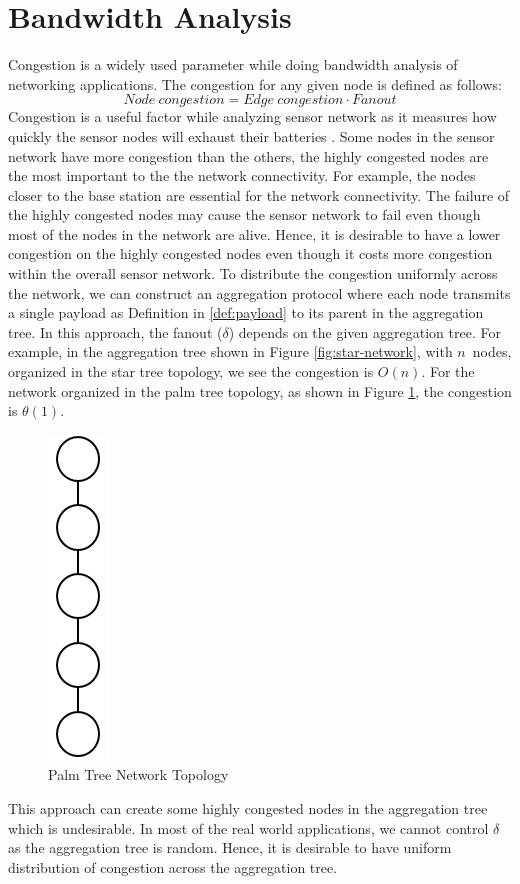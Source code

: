 \section{Bandwidth Analysis}
	Congestion is a widely used parameter while doing bandwidth analysis of networking applications.
	The congestion for any given node is defined as follows:
	\begin{equation}\label{def:congestion}
		Node\ congestion = Edge\ congestion \cdot Fanout
	\end{equation}
	Congestion is a useful factor while analyzing sensor network as it measures how quickly the sensor nodes will exhaust their batteries \cite{madden2003design}. 
	Some nodes in the sensor network have more congestion than the others, the highly congested nodes are the most important to the the network connectivity.
	For example, the nodes closer to the base station are essential for the network connectivity.
	The failure of the highly congested nodes may cause the sensor network to fail even though most of the nodes in the network are alive.
	Hence, it is desirable to have a lower congestion on the highly congested nodes even though it costs more congestion within the overall sensor network.
	To distribute the congestion uniformly across the network, we can construct an aggregation protocol where each node transmits a single payload as Definition in \ref{def:payload} to its parent in the aggregation tree.
	In this approach, the fanout ($\delta$) depends on the given aggregation tree.
	For example, in the aggregation tree shown in Figure \ref{fig:star-network}, with $n$\ nodes, organized in the star tree topology, we see the congestion is $O(n)$.
	For the network organized in the palm tree topology, as shown in Figure \ref{fig:palm-tree-network}, the congestion is $\theta(1)$.
	\begin{figure}[h!]
		\centering
		\includegraphics[scale = 1]{images/palm-tree.png}
		\caption{Palm Tree Network Topology}
		\label{fig:palm-tree-network}
	\end{figure}
	This approach can create some highly congested nodes in the aggregation tree which is undesirable.
	In most of the real world applications, we cannot control $\delta$ as the aggregation tree is random.
	Hence, it is desirable to have uniform distribution of congestion across the aggregation tree.

